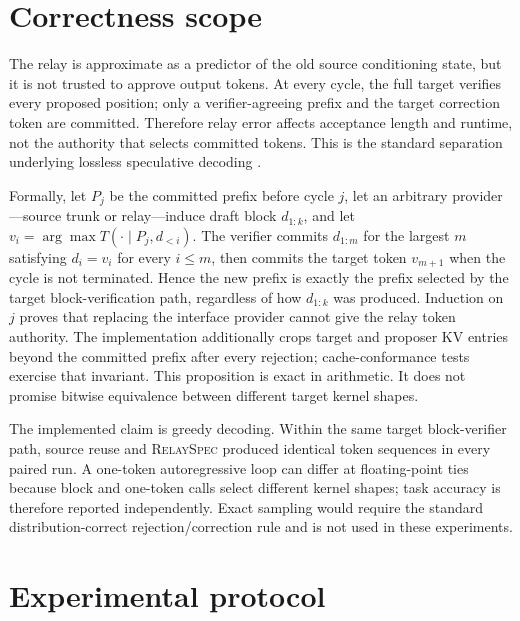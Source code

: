 \documentclass[10pt]{article}
\newcommand{\method}{\textsc{RelaySpec}}
\begin{document}
\section{Correctness scope}

The relay is approximate as a predictor of the old source conditioning state,
but it is not trusted to approve output tokens. At every cycle, the full target
verifies every proposed position; only a verifier-agreeing prefix and the
target correction token are committed. Therefore relay error affects
acceptance length and runtime, not the authority that selects committed
tokens. This is the standard separation underlying lossless speculative
decoding \cite{leviathan2023speculative,timor2025dsi,zhou2026hsd}.

Formally, let $P_j$ be the committed prefix before cycle $j$, let an arbitrary
provider---source trunk or relay---induce draft block $d_{1:k}$, and let
$v_i=\arg\max T(\cdot\mid P_j,d_{<i})$. The verifier commits
$d_{1:m}$ for the largest $m$ satisfying $d_i=v_i$ for every $i\leq m$, then
commits the target token $v_{m+1}$ when the cycle is not terminated. Hence the
new prefix is exactly the prefix selected by the target block-verification
path, regardless of how $d_{1:k}$ was produced. Induction on $j$ proves that
replacing the interface provider cannot give the relay token authority. The
implementation additionally crops target and proposer KV entries beyond the
committed prefix after every rejection; cache-conformance tests exercise that
invariant. This proposition is exact in arithmetic. It does not promise
bitwise equivalence between different target kernel shapes.

The implemented claim is greedy decoding. Within the same target block-verifier
path, source reuse and \method{} produced identical token sequences in every
paired run. A one-token autoregressive loop can differ at floating-point ties
because block and one-token calls select different kernel shapes; task
accuracy is therefore reported independently. Exact sampling would require
the standard distribution-correct rejection/correction rule and is not used
in these experiments.

\section{Experimental protocol}
\end{document}
